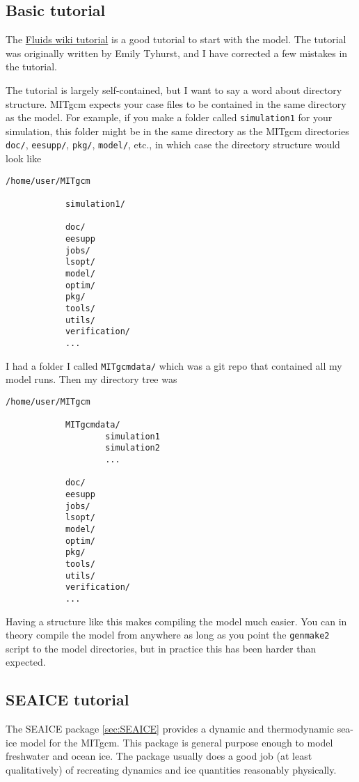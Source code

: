 \documentclass[11pt]{article}
\begin{document}
\subsection{Basic tutorial}
The \href{https://wiki.math.uwaterloo.ca/fluidswiki/index.php?title=MITgcmTutorial}{Fluids wiki tutorial} is a good tutorial to start with the model. The tutorial was originally written by Emily Tyhurst, and I have corrected a few mistakes in the tutorial.

The tutorial is largely self-contained, but I want to say a word about directory structure. MITgcm expects your case files to be contained in the same directory as the model. For example, if you make a folder called \verb|simulation1| for your simulation, this folder might be in the same directory as the MITgcm directories \verb|doc/|, \verb|eesupp/|, \verb|pkg/|, \verb|model/|, etc., in which case the directory structure would look like

\begin{lstlisting}
/home/user/MITgcm
			
			simulation1/

			doc/
			eesupp
			jobs/
			lsopt/
			model/
			optim/
			pkg/
			tools/
			utils/
			verification/
			...
\end{lstlisting}

I had a folder I called \verb|MITgcmdata/| which was a git repo that contained all my model runs. Then my directory tree was

\begin{lstlisting}
/home/user/MITgcm
			
			MITgcmdata/
					simulation1
					simulation2
					...

			doc/
			eesupp
			jobs/
			lsopt/
			model/
			optim/
			pkg/
			tools/
			utils/
			verification/
			...
\end{lstlisting}

Having a structure like this makes compiling the model much easier. You can in theory compile the model from anywhere as long as you point the \verb|genmake2| script to the model directories, but in practice this has been harder than expected.

\subsection{SEAICE tutorial}
The SEAICE package \ref{sec:SEAICE} provides a dynamic and thermodynamic sea-ice model for the MITgcm. This package is general purpose enough to model freshwater and ocean ice. The package usually does a good job (at least qualitatively) of recreating dynamics and ice quantities reasonably physically.
\end{document}
